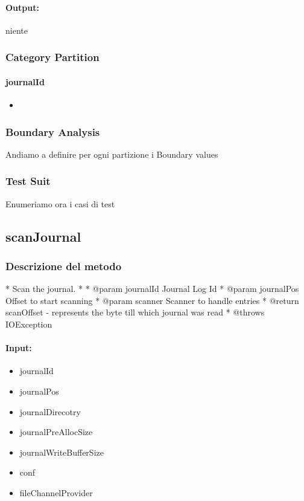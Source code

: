 \documentclass[12pt, a4paper]{article}
\begin{document}
\paragraph{Output:}
niente

\subsubsection{Category Partition}

\paragraph{journalId}
\begin{itemize}
  \item 
\end{itemize}



\subsubsection{Boundary Analysis}
Andiamo a definire per ogni partizione i Boundary values

\subsubsection{Test Suit}
Enumeriamo ora i casi di test








\subsection{scanJournal}
\subsubsection{Descrizione del metodo}
 * Scan the journal.
 *
 * @param journalId Journal Log Id
 * @param journalPos Offset to start scanning
 * @param scanner Scanner to handle entries
 * @return scanOffset - represents the byte till which journal was read
 * @throws IOException
\paragraph{Input:}
\begin{itemize}
  \item journalId
  \item journalPos
  \item journalDirecotry
  \item journalPreAllocSize
  \item journalWriteBufferSize
  \item conf
  \item fileChannelProvider
\end{itemize}
\end{document}
